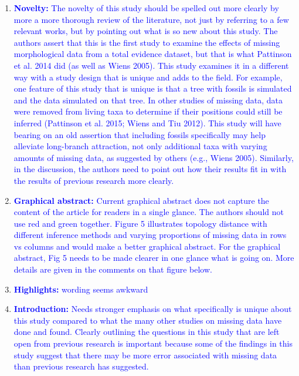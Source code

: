 \documentclass[12pt,letterpaper]{article}
\begin{document}
\begin{enumerate}
\item{\textcolor{blue}{\textbf{Novelty:} The novelty of this study should be spelled out more clearly by more a more thorough review of the literature, not just by referring to a few relevant works, but by pointing out what is so new about this study.
The authors assert that this is the first study to examine the effects of missing morphological data from a total evidence dataset, but that is what Pattinson et al. 2014 did (as well as Wiens 2005).
This study examines it in a different way with a study design that is unique and adds to the field. For example, one feature of this study that is unique is that a tree with fossils is simulated and the data simulated on that tree.
In other studies of missing data, data were removed from living taxa to determine if their positions could still be inferred (Pattinson et al. 2015; Wiens and Tiu 2012).
This study will have bearing on an old assertion that including fossils specifically may help alleviate long-branch attraction, not only additional taxa with varying amounts of missing data, as suggested by others (e.g., Wiens 2005).
Similarly, in the discussion, the authors need to point out how their results fit in with the results of previous research more clearly. }}

\item{\textcolor{blue}{\textbf{Graphical abstract:} Current graphical abstract does not capture the content of the article for readers in a single glance.
The authors should not use red and green together.
Figure 5 illustrates topology distance with different inference methods and varying proportions of missing data in rows vs columns and would make a better graphical abstract.
For the graphical abstract, Fig 5 needs to be made clearer in one glance what is going on.
More details are given in the comments on that figure below.}}

\item{\textcolor{blue}{\textbf{Highlights:} wording seems awkward}}

\item{\textcolor{blue}{\textbf{Introduction:} Needs stronger emphasis on what specifically is unique about this study compared to what the many other studies on missing data have done and found.
Clearly outlining the questions in this study that are left open from previous research is important because some of the findings in this study suggest that there may be more error associated with missing data than previous research has suggested.}}


\end{enumerate}
\end{document}
